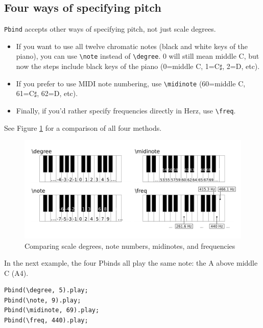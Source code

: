 \subsection{Four ways of specifying pitch}

\texttt{Pbind} accepts other ways of specifying pitch, not just scale degrees.
\begin{itemize}
\item If you want to use all twelve chromatic notes (black and white keys of the piano), you can use \texttt{\textbackslash note} instead of \texttt{\textbackslash degree}. 0 will still mean middle C, but now the steps include black keys of the piano (0=middle C, 1=C$\sharp$, 2=D, etc).
\item  If you prefer to use MIDI note numbering, use \texttt{\textbackslash midinote} (60=middle C, 61=C$\sharp$, 62=D, etc).
\item Finally, if you'd rather specify frequencies directly in Herz, use \texttt{\textbackslash freq}.
\end{itemize}

See Figure \ref{fig:scale-degrees} for a comparison of all four methods.

\begin{figure}[h]
\centering
\includegraphics[scale=0.4]{fig-piano-keyboard-degree-note-midinote-freq2.png}
\caption{Comparing scale degrees, note numbers, midinotes, and frequencies}
\label{fig:scale-degrees}
\end{figure}

In the next example, the four Pbinds all play the same note: the A above middle C (A4).

\begin{lstlisting}[style=SuperCollider-IDE, basicstyle=\scttfamily\footnotesize]
Pbind(\degree, 5).play;
Pbind(\note, 9).play;
Pbind(\midinote, 69).play;
Pbind(\freq, 440).play;
\end{lstlisting}


